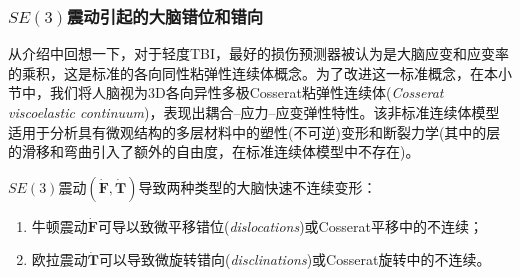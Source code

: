 \documentclass[11pt,fontset=founder]{ctexart}
\begin{document}
\subsubsection{$SE(3)$震动引起的大脑错位和错向}

从介绍中回想一下，对于轻度TBI，最好的损伤预测器被认为是大脑应变和应变率的乘积，这是标准的各向同性粘弹性连续体概念。为了改进这一标准概念，在本小节中，我们将人脑视为3D各向异性多极Cosserat粘弹性连续体(\emph{Cosserat viscoelastic continuum})，表现出耦合–应力–应变弹性特性。该非标准连续体模型适用于分析具有微观结构的多层材料中的塑性(不可逆)变形和断裂力学(其中的层的滑移和弯曲引入了额外的自由度，在标准连续体模型中不存在)。

$SE(3)$震动$(\boldsymbol{\dot{\mathbf F},\dot{\mathbf T}})$导致两种类型的大脑快速不连续变形：

\begin{enumerate}
\item  牛顿震动$\boldsymbol{\dot{\mathbf F}}$可导以致微平移错位(\emph{dislocations})或Cosserat平移中的不连续；

\item  欧拉震动$\boldsymbol{\dot{\mathbf T}}$可以导致微旋转错向(\emph{disclinations})或Cosserat旋转中的不连续。
\end{enumerate}
\end{document}
